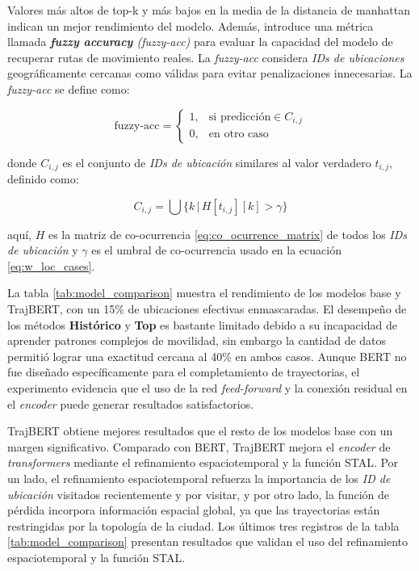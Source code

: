 Valores más altos de top-k y más bajos en la media de la distancia de manhattan indican un mejor rendimiento del modelo. Además, \cite{si2023trajbert} introduce una métrica llamada \textit{\textbf{fuzzy accuracy} (fuzzy-acc)} para evaluar la capacidad del modelo de recuperar rutas de movimiento reales. La \textit{fuzzy-acc} considera \textit{IDs de ubicaciones} geográficamente cercanas como válidas para evitar penalizaciones innecesarias. La \textit{fuzzy-acc} se define como:

\begin{equation}
    \text{fuzzy-acc} = 
    \begin{cases} 
    1, & \text{si } \text{predicción} \in C_{i,j} \\
    0, & \text{en otro caso}
    \end{cases}
\end{equation}
 
\noindent
donde $C_{i,j}$ es el conjunto de \textit{IDs de ubicación} similares al valor verdadero $t_{i,j}$, definido como:

\begin{equation}
    C_{i,j} = \bigcup \{k \,|\, H[t_{i,j}][k] > \gamma\}
\end{equation}

\noindent
aquí, $H$ es la matriz de co-ocurrencia \ref{eq:co_ocurrence_matrix} de todos los \textit{IDs de ubicación} y $\gamma$ es el umbral de co-ocurrencia usado en la ecuación \ref{eq:w_loc_cases}. 

La tabla \ref{tab:model_comparison} muestra el rendimiento de los modelos base y TrajBERT, con un 15\% de ubicaciones efectivas enmascaradas. El desempeño de los métodos \textbf{Histórico} y \textbf{Top} es bastante limitado debido a su incapacidad de aprender patrones complejos de movilidad, sin embargo la cantidad de datos permitió lograr una exactitud cercana al 40\% en ambos casos. Aunque BERT no fue diseñado específicamente para el completamiento de trayectorias, el experimento evidencia que el uso de la red \textit{feed-forward} y la conexión residual en el \textit{encoder} puede generar resultados satisfactorios.

TrajBERT obtiene mejores resultados que el resto de los modelos base con un margen significativo. Comparado con BERT, TrajBERT mejora el \textit{encoder} de \textit{transformers} mediante el refinamiento espaciotemporal y la función STAL. Por un lado, el refinamiento espaciotemporal refuerza la importancia de los \textit{ID de ubicación} visitados recientemente y por visitar, y por otro lado, la función de pérdida incorpora información espacial global, ya que las trayectorias están restringidas por la topología de la ciudad. Los últimos tres registros de la tabla \ref{tab:model_comparison} presentan resultados que validan el uso del refinamiento espaciotemporal y la función STAL.


